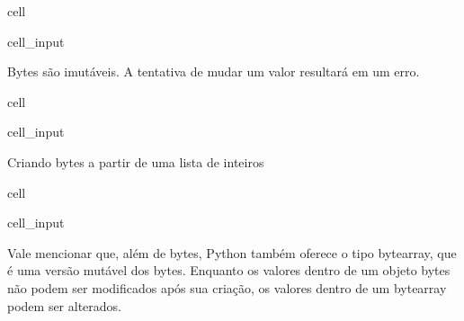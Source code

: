 \documentclass[letterpaper,10pt,english]{jupyterBook}
\begin{document}
\begin{sphinxuseclass}{cell}\begin{sphinxVerbatimInput}

\begin{sphinxuseclass}{cell_input}
\begin{sphinxVerbatim}[commandchars=\\\{\}]
  \PYG{p}{[}\PYG{p}{]}
\end{sphinxVerbatim}

\end{sphinxuseclass}\end{sphinxVerbatimInput}

\end{sphinxuseclass}
\sphinxAtStartPar
Bytes são imutáveis. A tentativa de mudar um valor resultará em um erro.

\begin{sphinxuseclass}{cell}\begin{sphinxVerbatimInput}

\begin{sphinxuseclass}{cell_input}
\begin{sphinxVerbatim}[commandchars=\\\{\}]
\end{sphinxVerbatim}

\end{sphinxuseclass}\end{sphinxVerbatimInput}

\end{sphinxuseclass}
\sphinxAtStartPar
Criando bytes a partir de uma lista de inteiros

\begin{sphinxuseclass}{cell}\begin{sphinxVerbatimInput}

\begin{sphinxuseclass}{cell_input}
\begin{sphinxVerbatim}[commandchars=\\\{\}]
  \PYG{p}{[}  \PYG{p}{]}
  
\end{sphinxVerbatim}

\end{sphinxuseclass}\end{sphinxVerbatimInput}

\end{sphinxuseclass}
\sphinxAtStartPar
Vale mencionar que, além de bytes, Python também oferece o tipo bytearray, que é uma versão mutável dos bytes. Enquanto os valores dentro de um objeto bytes não podem ser modificados após sua criação, os valores dentro de um bytearray podem ser alterados.
\end{document}
